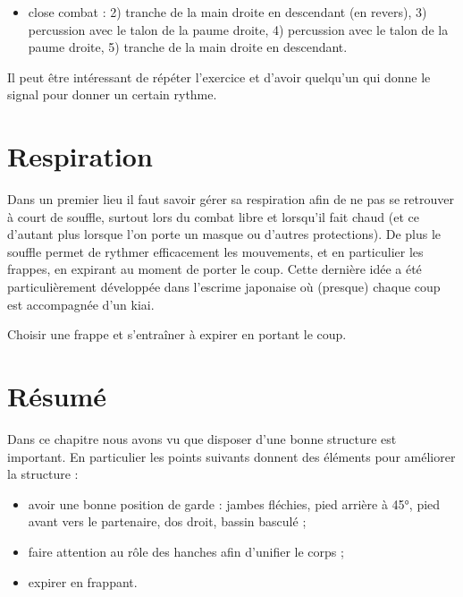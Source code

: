 \begin{exercice}
\begin{itemize}
	\item close combat : 2) tranche de la main droite en descendant (en revers), 3) percussion avec le talon de la paume droite, 4) percussion avec le talon de la paume droite, 5) tranche de la main droite en descendant.
	
	
\end{itemize}

Il peut être intéressant de répéter l'exercice et d'avoir quelqu'un qui donne le signal pour donner un certain rythme.

\end{exercice}


\section{Respiration}


Dans un premier lieu il faut savoir gérer sa respiration afin de ne pas se retrouver à court de souffle, surtout lors du combat libre et lorsqu'il fait chaud (et ce d'autant plus lorsque l'on porte un masque ou d'autres protections).
De plus le souffle permet de rythmer efficacement les mouvements, et en particulier les frappes, en expirant au moment de porter le coup.
Cette dernière idée a été particulièrement développée dans l'escrime japonaise où (presque) chaque coup est accompagnée d'un kiai.


\begin{exercice}

Choisir une frappe et s'entraîner à expirer en portant le coup.

\end{exercice}


\section{Résumé}


Dans ce chapitre nous avons vu que disposer d'une bonne structure est important.
En particulier les points suivants donnent des éléments pour améliorer la structure :
\begin{itemize}
	\item avoir une bonne position de garde : jambes fléchies, pied arrière à 45°, pied avant vers le partenaire, dos droit, bassin basculé ;
	\item faire attention au rôle des hanches afin d'unifier le corps ;
	\item expirer en frappant.
\end{itemize}



